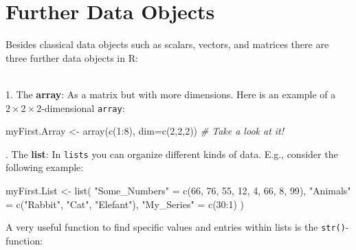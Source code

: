 \documentclass[
  14pt,
]{memoir}
\newenvironment{Shaded}{\begin{snugshade}}{\end{snugshade}}
\newcommand{\AttributeTok}[1]{\textcolor[rgb]{0.77,0.63,0.00}{#1}}
\newcommand{\CommentTok}[1]{\textcolor[rgb]{0.56,0.35,0.01}{\textit{#1}}}
\newcommand{\DecValTok}[1]{\textcolor[rgb]{0.00,0.00,0.81}{#1}}
\newcommand{\FunctionTok}[1]{\textcolor[rgb]{0.00,0.00,0.00}{#1}}
\newcommand{\NormalTok}[1]{#1}
\newcommand{\OtherTok}[1]{\textcolor[rgb]{0.56,0.35,0.01}{#1}}
\newcommand{\SpecialCharTok}[1]{\textcolor[rgb]{0.00,0.00,0.00}{#1}}
\newcommand{\StringTok}[1]{\textcolor[rgb]{0.31,0.60,0.02}{#1}}
\begin{document}
\hypertarget{further-data-objects}{%
\section{Further Data Objects}\label{further-data-objects}}

Besides classical data objects such as scalars, vectors, and matrices there are three further data objects in R:\\
\strut \\
1. The \textbf{array}: As a matrix but with more dimensions. Here is an example of a \(2\times 2\times 2\)-dimensional \texttt{array}:

\begin{Shaded}
\begin{Highlighting}[]
\NormalTok{myFirst.Array }\OtherTok{\textless{}{-}} \FunctionTok{array}\NormalTok{(}\FunctionTok{c}\NormalTok{(}\DecValTok{1}\SpecialCharTok{:}\DecValTok{8}\NormalTok{), }\AttributeTok{dim=}\FunctionTok{c}\NormalTok{(}\DecValTok{2}\NormalTok{,}\DecValTok{2}\NormalTok{,}\DecValTok{2}\NormalTok{)) }\CommentTok{\# Take a look at it!}
\end{Highlighting}
\end{Shaded}

\hfill\break
\hfill{}. The \textbf{list}: In \texttt{lists} you can organize different kinds of data. E.g., consider the following example:

\begin{Shaded}
\begin{Highlighting}[]
\NormalTok{myFirst.List }\OtherTok{\textless{}{-}} \FunctionTok{list}\NormalTok{(}
  \StringTok{"Some\_Numbers"} \OtherTok{=} \FunctionTok{c}\NormalTok{(}\DecValTok{66}\NormalTok{, }\DecValTok{76}\NormalTok{, }\DecValTok{55}\NormalTok{, }\DecValTok{12}\NormalTok{, }\DecValTok{4}\NormalTok{, }\DecValTok{66}\NormalTok{, }\DecValTok{8}\NormalTok{, }\DecValTok{99}\NormalTok{), }
  \StringTok{"Animals"}      \OtherTok{=} \FunctionTok{c}\NormalTok{(}\StringTok{"Rabbit"}\NormalTok{, }\StringTok{"Cat"}\NormalTok{, }\StringTok{"Elefant"}\NormalTok{),}
  \StringTok{"My\_Series"}    \OtherTok{=} \FunctionTok{c}\NormalTok{(}\DecValTok{30}\SpecialCharTok{:}\DecValTok{1}\NormalTok{)}
\NormalTok{) }
\end{Highlighting}
\end{Shaded}

A very useful function to find specific values and entries within lists is the \texttt{str()}-function:

\begin{Shaded}
\end{Shaded}
\end{document}
